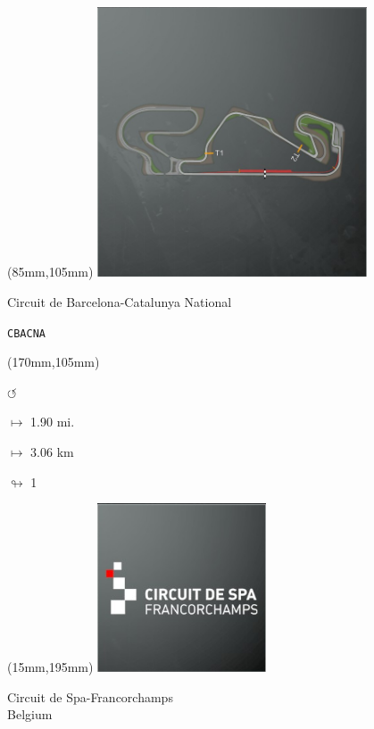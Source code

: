 \begin{textblock*}{80mm}(85mm,105mm)%
\includegraphics[width=80mm]{TR/2015-05-20_00019.png}
\centerline{Circuit de Barcelona-Catalunya National}
\par\hfill\tiny\tt CBACNA\\
\end{textblock*}
\begin{textblock*}{30mm}(170mm,105mm)%
\par \Huge$\circlearrowleft$
\Large
\par$\mapsto$ 1.90 mi.
\par$\mapsto$ 3.06 km
\par$\looparrowright$ 1
\end{textblock*}
\begin{textblock*}{60mm}(15mm,195mm)%
\includegraphics[width=50mm]{LG/2015-05-20_00079.png}
\par Circuit de Spa-Francorchamps\\ Belgium
\end{textblock*}
